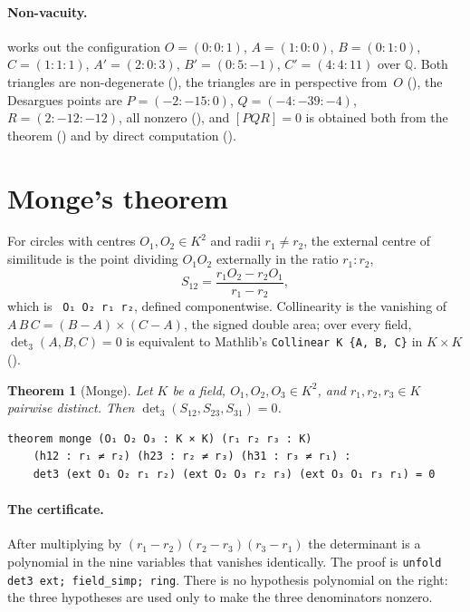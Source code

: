 \documentclass[11pt]{article}
\newtheorem{theorem}{Theorem}
\theoremstyle{definition}
\theoremstyle{remark}
\newcommand{\lean}[1]{\texttt{#1}}
\newcommand{\QQ}{\mathbb{Q}}
\begin{document}
\paragraph{Non-vacuity.}  works out the configuration $O=(0{:}0{:}1)$,
$A=(1{:}0{:}0)$, $B=(0{:}1{:}0)$, $C=(1{:}1{:}1)$, $A'=(2{:}0{:}3)$, $B'=(0{:}5{:}{-1})$,
$C'=(4{:}4{:}11)$ over $\QQ$. Both triangles are non-degenerate (),
the triangles are in perspective from~$O$ (), the Desargues points
are $P=(-2{:}-15{:}0)$, $Q=(-4{:}-39{:}-4)$, $R=(2{:}-12{:}-12)$, all nonzero
(), and $[PQR]=0$ is obtained both from the theorem
() and by direct computation ().

\section{Monge's theorem}\label{sec:monge}

For circles with centres $O_1,O_2\in K^2$ and radii $r_1\ne r_2$, the external centre of
similitude is the point dividing $O_1O_2$ externally in the ratio $r_1:r_2$,
\[
S_{12}=\frac{r_1O_2-r_2O_1}{r_1-r_2},
\]
which is ~\lean{O₁ O₂ r₁ r₂}, defined componentwise. Collinearity is the vanishing
of ~$A\,B\,C=(B-A)\times(C-A)$, the signed double area; over every field,
$\det_3(A,B,C)=0$ is equivalent to Mathlib's \lean{Collinear K \{A, B, C\}} in $K\times K$
().

\begin{theorem}[Monge]\label{thm:monge}
Let $K$ be a field, $O_1,O_2,O_3\in K^2$, and $r_1,r_2,r_3\in K$ pairwise distinct. Then
$\det_3(S_{12},S_{23},S_{31})=0$.
\end{theorem}

\begin{lstlisting}
theorem monge (O₁ O₂ O₃ : K × K) (r₁ r₂ r₃ : K)
    (h12 : r₁ ≠ r₂) (h23 : r₂ ≠ r₃) (h31 : r₃ ≠ r₁) :
    det3 (ext O₁ O₂ r₁ r₂) (ext O₂ O₃ r₂ r₃) (ext O₃ O₁ r₃ r₁) = 0
\end{lstlisting}

\paragraph{The certificate.} After multiplying by $(r_1-r_2)(r_2-r_3)(r_3-r_1)$ the determinant
is a polynomial in the nine variables that vanishes identically. The proof is
\lean{unfold det3 ext; field\_simp; ring}. There is no hypothesis polynomial on the right: the
three hypotheses are used only to make the three denominators nonzero.
\end{document}
